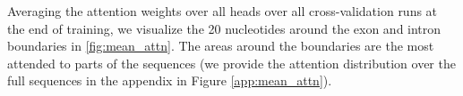 Averaging the attention weights over all heads over all cross-validation runs at the end of training, we visualize the 20 nucleotides around the exon and intron boundaries in \ref{fig:mean_attn}. The areas around the boundaries are the most attended to parts of the sequences (we provide the attention distribution over the full sequences in the appendix in Figure \ref{app:mean_attn}).



